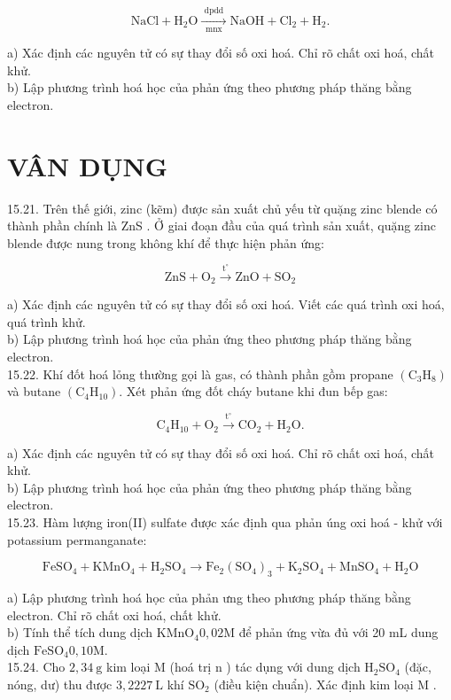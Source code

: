 \documentclass[10pt]{article}
\begin{document}
$$
\mathrm{NaCl}+\mathrm{H}_{2} \mathrm{O} \xrightarrow[\operatorname{mnx}]{\text { dpdd }} \mathrm{NaOH}+\mathrm{Cl}_{2}+\mathrm{H}_{2} .
$$

a) Xác định các nguyên tử có sự thay đổi số oxi hoá. Chỉ rõ chất oxi hoá, chất khử.\\
b) Lập phương trình hoá học của phản ứng theo phương pháp thăng bằng electron.

\section*{VÂN DỤNG}
15.21. Trên thế giới, zinc (kẽm) được sản xuất chủ yếu từ quặng zinc blende có thành phần chính là ZnS . Ở giai đoạn đầu của quá trình sản xuất, quặng zinc blende được nung trong không khí để thực hiện phản ứng:

$$
\mathrm{ZnS}+\mathrm{O}_{2} \xrightarrow{\mathrm{t}^{\circ}} \mathrm{ZnO}+\mathrm{SO}_{2}
$$

a) Xác định các nguyên tử có sự thay đổi số oxi hoá. Viết các quá trình oxi hoá, quá trình khử.\\
b) Lập phương trình hoá học của phản ứng theo phương pháp thăng bằng electron.\\
15.22. Khí đốt hoá lỏng thường gọi là gas, có thành phần gồm propane $\left(\mathrm{C}_{3} \mathrm{H}_{8}\right)$ và butane $\left(\mathrm{C}_{4} \mathrm{H}_{10}\right)$. Xét phản ứng đốt cháy butane khi đun bếp gas:

$$
\mathrm{C}_{4} \mathrm{H}_{10}+\mathrm{O}_{2} \xrightarrow{\mathrm{t}^{\circ}} \mathrm{CO}_{2}+\mathrm{H}_{2} \mathrm{O} .
$$

a) Xác định các nguyên tử có sự thay đổi số oxi hoá. Chỉ rõ chất oxi hoá, chất khử.\\
b) Lập phương trình hoá học của phản ứng theo phương pháp thăng bằng electron.\\
15.23. Hàm lượng iron(II) sulfate được xác định qua phản úng oxi hoá - khử với potassium permanganate:

$$
\mathrm{FeSO}_{4}+\mathrm{KMnO}_{4}+\mathrm{H}_{2} \mathrm{SO}_{4} \longrightarrow \mathrm{Fe}_{2}\left(\mathrm{SO}_{4}\right)_{3}+\mathrm{K}_{2} \mathrm{SO}_{4}+\mathrm{MnSO}_{4}+\mathrm{H}_{2} \mathrm{O}
$$

a) Lập phương trình hoá học của phản ưng theo phương pháp thăng bằng electron. Chỉ rõ chất oxi hoá, chất khử.\\
b) Tính thể tích dung dịch $\mathrm{KMnO}_{4} 0,02 \mathrm{M}$ để phản ứng vừa đủ với 20 mL dung dịch $\mathrm{FeSO}_{4} 0,10 \mathrm{M}$.\\
15.24. Cho $2,34 \mathrm{~g}$ kim loại M (hoá trị n ) tác dụng với dung dịch $\mathrm{H}_{2} \mathrm{SO}_{4}$ (đặc, nóng, dư) thu được $3,2227 \mathrm{~L}$ khí $\mathrm{SO}_{2}$ (điều kiện chuẩn). Xác định kim loại M .
\end{document}
